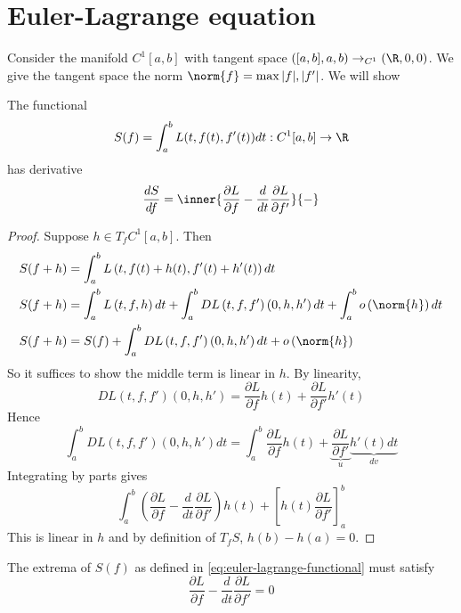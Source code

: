 \documentclass{scrartcl}
\begin{document}
\section{Euler-Lagrange equation}
Consider the manifold $C^1[a,b]$ with tangent space $([a,b],a,b)\to_{C^1} (\R,0,0)$. We give the tangent space the norm $\norm{f}=\max{|f|,|f'|}$. We will show
\begin{theorem}
  The functional
  \begin{equation}
    \label{eq:euler-lagrange-functional}
  S(f)=\int_a^b L(t,f(t),f'(t))dt : C^1[a,b]\to \R
  \end{equation}
  has derivative 
  \begin{equation}
  \frac {dS}{df} = \inner{\frac{\partial L}{\partial f}-\frac d {dt} \frac{\partial L}{\partial f'}}{-}
  \label{eq:euler-lagrange-deriv}
  \end{equation}
\end{theorem}
\begin{proof}
  Suppose $h\in T_fC^1[a,b]$. Then
  \[
  \begin{align*}
    S(f+h)&=\int_a^b L\left(t,f(t)+h(t),f'(t)+h'(t)\right) dt \\
    S(f+h)&=\int_a^b L\left(t,f,h\right) dt + \int_a^b DL\left(t,f,f'\right)\left(0,h,h'\right) dt + \int_a^b o\left(\norm{h}\right) dt \\
    S(f+h)&=S(f)+ \int_a^b DL\left(t,f,f'\right)\left(0,h,h'\right) dt +o\left(\norm{h}\right) \\
  \end{align*}
  \]
  So it suffices to show the middle term is linear in $h$. By linearity, 
  \[
   DL\left(t,f,f'\right)\left(0,h,h'\right) = \frac{\partial L}{\partial f} h(t) + \frac{\partial L}{\partial f'} h'(t)
  \]
  Hence 
  \[
   \int_a^b DL\left(t,f,f'\right)\left(0,h,h'\right) dt = \int_a^b\frac{\partial L}{\partial f} h(t) + \underbrace{\frac{\partial L}{\partial f'}}_u \underbrace{h'(t) dt}_{dv} 
  \]
  Integrating by parts gives 
  \[
  \int_a^b \left(\frac{\partial L}{\partial f} - \frac{d}{dt}\frac{\partial L}{\partial f'} \right) h(t) + \left [h(t) \frac{\partial L}{\partial f'} \right]_a^b
  \]
  This is linear in $h$ and by definition of $T_f S$, $h(b)-h(a) =0$. 
\end{proof}
\begin{cor}
  The extrema of $S(f)$ as defined in \cref{eq:euler-lagrange-functional} must satisfy 
  \[
  \frac{\partial L}{\partial f} - \frac{d}{dt}\frac{\partial L} {\partial f'} =0 
  \]
\end{cor}
\end{document}
